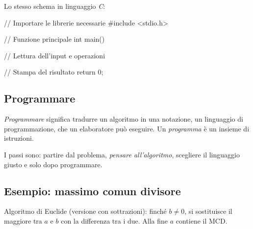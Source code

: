 \documentclass[11pt,a4paper]{article}
\begin{document}
Lo stesso schema in linguaggio \textit{C}:
\begin{codice}
// Importare le librerie necessarie
#include <stdio.h>

// Funzione principale
int main() {
    // Lettura dell'input e operazioni

    // Stampa del risultato
    return 0;
}
\end{codice}

\subsection{Programmare}

\begin{definizione}
\emph{Programmare} significa tradurre un algoritmo in una notazione, un
linguaggio di programmazione, che un elaboratore può eseguire. Un
\emph{programma} è un insieme di istruzioni.
\end{definizione}

I passi sono: partire dal problema, \emph{pensare all'algoritmo}, scegliere il
linguaggio giusto e solo dopo programmare.

\subsection{Esempio: massimo comun divisore}

Algoritmo di Euclide (versione con sottrazioni): finché $b \neq 0$, si
sostituisce il maggiore tra $a$ e $b$ con la differenza tra i due. Alla fine $a$
contiene il MCD.

\begin{center}
\end{center}
\end{document}
